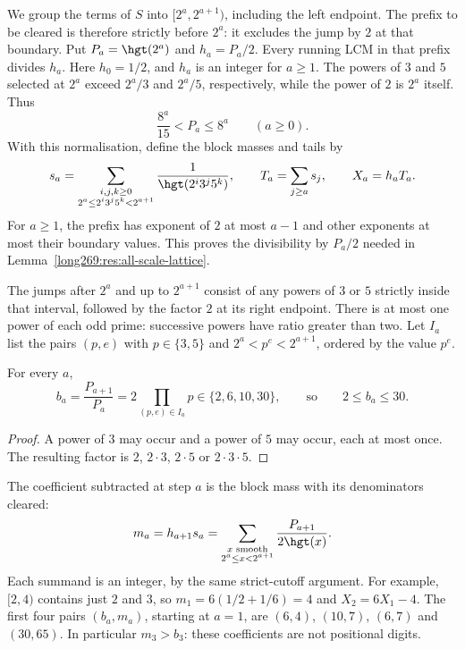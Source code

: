 We group the terms of $S$ into $[2^a,2^{a+1})$, including the left
endpoint. The prefix to be cleared is therefore strictly before $2^a$:
it excludes the jump by $2$ at that boundary. Put $P_a=\hgt(2^a)$ and
$h_a=P_a/2$. Every running LCM in that prefix divides $h_a$.
Here $h_0=1/2$, and $h_a$ is an integer for $a\ge1$.
The powers of $3$ and $5$ selected at $2^a$ exceed $2^a/3$ and $2^a/5$,
respectively, while the power of $2$ is $2^a$ itself. Thus
\[
 \frac{8^a}{15}<P_a\le8^a\qquad(a\ge0).
\]
With this normalisation, define the block masses and tails by
\begin{equation}\label{long269:eq:actual-tail}
 s_a=\sum_{\substack{i,j,k\ge0\\2^a\le2^i3^j5^k<2^{a+1}}}
         \frac1{\hgt(2^i3^j5^k)},\qquad
 T_a=\sum_{j\ge a}s_j,\qquad X_a=h_aT_a.
\end{equation}
For $a\ge1$, the prefix has exponent of $2$ at most $a-1$ and other
exponents at most their boundary values. This proves the divisibility
by $P_a/2$ needed in Lemma~\ref{long269:res:all-scale-lattice}.

The jumps after $2^a$ and up to $2^{a+1}$ consist of any powers of $3$ or
$5$ strictly inside that interval, followed by the factor $2$ at its right
endpoint.  There is at most one power of each odd prime: successive
powers have ratio greater than two.  Let $I_a$ list the pairs $(p,e)$ with
$p\in\{3,5\}$ and $2^a<p^e<2^{a+1}$, ordered by the value $p^e$.

\begin{proposition}\label{long269:res:dyadic-alphabet}
For every $a$,
\begin{equation}\label{long269:eq:dyadic-alphabet}
 b_a=\frac{P_{a+1}}{P_a}=2\prod_{(p,e)\in I_a}p\in\{2,6,10,30\},
 \qquad\text{so}\qquad 2\le b_a\le30 .
\end{equation}
\end{proposition}

\begin{proof}
A power of $3$ may occur and a power of $5$ may occur, each at most once.
The resulting factor is $2$, $2\cdot3$, $2\cdot5$ or $2\cdot3\cdot5$.
\end{proof}


The coefficient subtracted at step $a$ is the block mass with its
denominators cleared:
\[
 m_a=h_{a+1}s_a
 =\sum_{\substack{x\text{ smooth}\\2^a\le x<2^{a+1}}}
       \frac{P_{a+1}}{2\hgt(x)}.
\]
Each summand is an integer, by the same strict-cutoff argument.
For example, $[2,4)$ contains just $2$ and $3$, so
$m_1=6(1/2+1/6)=4$ and $X_2=6X_1-4$.
The first four pairs $(b_a,m_a)$, starting at $a=1$, are
$(6,4)$, $(10,7)$, $(6,7)$ and $(30,65)$.
In particular $m_3>b_3$: these coefficients are not positional digits.

